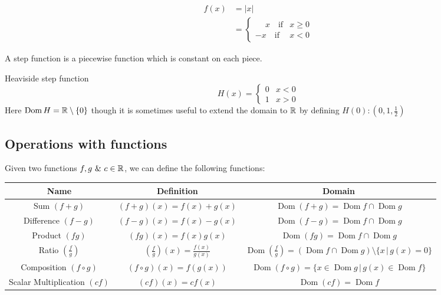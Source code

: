 \documentclass[10pt, a4paper]{article}
\DeclareMathOperator{\Dom}{Dom}
\begin{document}
\begin{example}
    \begin{align*}
        f(x) &= |x| \\
        &= \begin{cases}
            \phantom{-}x\quad \text{if} &x \geq 0 \\
            -x\quad \text{if} &x < 0
        \end{cases}
    \end{align*}
\end{example}

A step function is a piecewise function which is constant on each piece.
\begin{example}
    Heaviside step function
    \[
    H(x) = \begin{cases}
        0 & x < 0 \\
        1 & x > 0
    \end{cases}
    \]
    Here $\Dom H = \R \setminus \{0\}$ though it is sometimes useful to extend the domain to $\mathbb{R}$ by defining $H(0): (0, 1, \frac{1}{2})$
\end{example}

\subsection{Operations with functions}
Given two functions $f, g\  \&\  c \in \mathbb{R}$, we can define the following functions:
\begin{table}[H]
    \centering
    \begin{tabular}{|c|c|c|}
        \hline
        Name & Definition & Domain \\
        \hline
        Sum $(f + g)$ & $(f + g)(x) = f(x) + g(x)$ & $\Dom (f + g) = \Dom f \cap \Dom g$ \\
        Difference $(f - g)$ & $(f - g)(x) = f(x) - g(x)$ & $\Dom (f - g) = \Dom f \cap \Dom g$ \\
        Product $(fg)$ & $(fg)(x) = f(x)g(x)$ & $\Dom (fg) = \Dom f \cap \Dom g$ \\
        Ratio $\left(\frac{f}{g}\right)$ & $\left(\frac{f}{g}\right)(x) = \frac{f(x)}{g(x)}$ & $\Dom \left(\frac{f}{g}\right) = (\Dom f \cap \Dom g) \setminus \{x\,|\,g(x) = 0\}$ \\
        Composition $(f\circ g)$ & $(f \circ g)(x) = f(g(x))$ & $\Dom (f \circ g) = \{x \in \Dom g\,|\, g(x) \in \Dom f\}$ \\
        Scalar Multiplication $(cf)$ & $(cf)(x) = cf(x)$ & $\Dom (cf) = \Dom f$ \\
        \hline
    \end{tabular}
\end{table}
\end{document}
